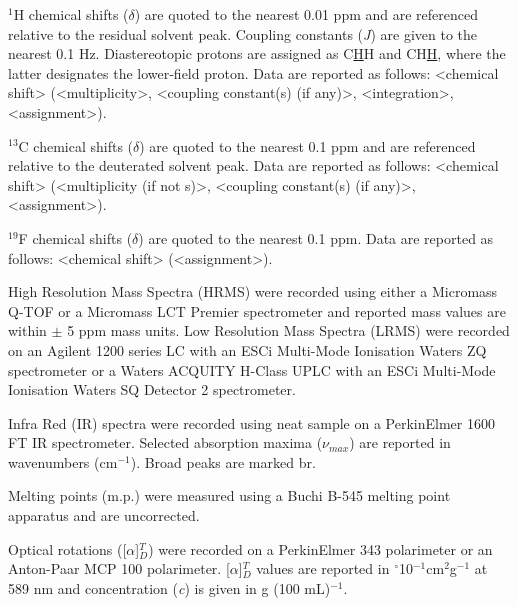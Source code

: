 $^1$H chemical shifts ($\delta$) are quoted to the nearest 0.01 ppm and are referenced relative to the residual solvent peak\cite{Gottlieb1997}. Coupling constants (\textit{J}) are given to the nearest 0.1 Hz. Diastereotopic protons are assigned as C\underline{H}H and CH\underline{H},
where the latter designates the lower‑field proton. Data are reported as follows: <chemical shift> (<multiplicity>, <coupling constant(s) (if any)>, <integration>, <assignment>).

$^{13}$C chemical shifts ($\delta$) are quoted to the nearest 0.1 ppm and are referenced relative to the deuterated solvent peak\cite{Gottlieb1997}. Data are reported as follows: <chemical shift> (<multiplicity (if not s)>, <coupling constant(s) (if any)>, <assignment>).

$^{19}$F chemical shifts ($\delta$) are quoted to the nearest 0.1 ppm. Data are reported as follows: <chemical shift> (<assignment>).

High Resolution Mass Spectra (HRMS) were recorded using either a Micromass Q-TOF or a Micromass LCT Premier spectrometer and reported mass values are within $\pm$ 5 ppm mass units. Low Resolution Mass Spectra (LRMS) were recorded on an Agilent 1200 series LC with an ESCi Multi-Mode Ionisation Waters ZQ spectrometer or a Waters ACQUITY H-Class UPLC with an ESCi Multi-Mode Ionisation Waters SQ Detector 2 spectrometer.

Infra Red (IR) spectra were recorded using neat sample on a PerkinElmer 1600 FT IR spectrometer. Selected absorption maxima ($\nu_{max}$) are reported in wavenumbers (cm$^{-1}$). Broad peaks are marked br.

Melting points (m.p.) were measured using a Buchi B-545 melting point apparatus and are uncorrected. 

Optical rotations ([$\alpha$]$_D^T$) were recorded on a PerkinElmer 343 polarimeter or an Anton-Paar MCP 100 polarimeter. [$\alpha$]$_D^T$ values are reported in $^{\circ}$10$^{-1}$cm$^2$g$^{-1}$ at 589 nm and concentration (\textit{c}) is given in g (100 mL)$^{-1}$. 


